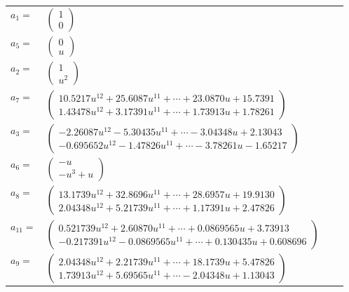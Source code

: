 \documentclass[1p]{elsarticle_modified}
\theoremstyle{definition}
\begin{document}
\begin{tabular}{m{7pt} m{180pt} m{7pt} m{180pt} }
\flushright $a_{1}=$&$\begin{pmatrix}1\\0\end{pmatrix}$ \\
\flushright $a_{5}=$&$\begin{pmatrix}0\\u\end{pmatrix}$ \\
\flushright $a_{2}=$&$\begin{pmatrix}1\\u^2\end{pmatrix}$ \\
\flushright $a_{7}=$&$\begin{pmatrix}10.5217 u^{12}+25.6087 u^{11}+\cdots+23.0870 u+15.7391\\1.43478 u^{12}+3.17391 u^{11}+\cdots+1.73913 u+1.78261\end{pmatrix}$ \\
\flushright $a_{3}=$&$\begin{pmatrix}-2.26087 u^{12}-5.30435 u^{11}+\cdots-3.04348 u+2.13043\\-0.695652 u^{12}-1.47826 u^{11}+\cdots-3.78261 u-1.65217\end{pmatrix}$ \\
\flushright $a_{6}=$&$\begin{pmatrix}- u\\- u^3+u\end{pmatrix}$ \\
\flushright $a_{8}=$&$\begin{pmatrix}13.1739 u^{12}+32.8696 u^{11}+\cdots+28.6957 u+19.9130\\2.04348 u^{12}+5.21739 u^{11}+\cdots+1.17391 u+2.47826\end{pmatrix}$ \\
\flushright $a_{11}=$&$\begin{pmatrix}0.521739 u^{12}+2.60870 u^{11}+\cdots+0.0869565 u+3.73913\\-0.217391 u^{12}-0.0869565 u^{11}+\cdots+0.130435 u+0.608696\end{pmatrix}$ \\
\flushright $a_{9}=$&$\begin{pmatrix}2.04348 u^{12}+2.21739 u^{11}+\cdots+18.1739 u+5.47826\\1.73913 u^{12}+5.69565 u^{11}+\cdots-2.04348 u+1.13043\end{pmatrix}$ \\

\end{tabular}
\end{document}
